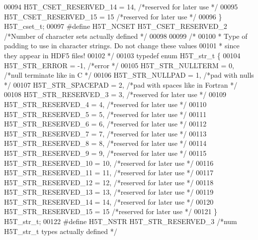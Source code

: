 \begin{DoxyCode}
00094     H5T\_CSET\_RESERVED\_14 = 14,  \textcolor{comment}{/*reserved for later use             */}
00095     H5T\_CSET\_RESERVED\_15 = 15   \textcolor{comment}{/*reserved for later use             */}
00096 \} H5T\_cset\_t;
00097 \textcolor{preprocessor}{#define H5T\_NCSET H5T\_CSET\_RESERVED\_2           }\textcolor{comment}{/*Number of character sets actually defined  */}\textcolor{preprocessor}{}
00098 
00099 \textcolor{comment}{/*}
00100 \textcolor{comment}{ * Type of padding to use in character strings.  Do not change these values}
00101 \textcolor{comment}{ * since they appear in HDF5 files!}
00102 \textcolor{comment}{ */}
00103 \textcolor{keyword}{typedef} \textcolor{keyword}{enum} H5T\_str\_t \{
00104     H5T\_STR\_ERROR        = -1,  \textcolor{comment}{/*error                                      */}
00105     H5T\_STR\_NULLTERM     = 0,   \textcolor{comment}{/*null terminate like in C                   */}
00106     H5T\_STR\_NULLPAD      = 1,   \textcolor{comment}{/*pad with nulls                             */}
00107     H5T\_STR\_SPACEPAD     = 2,   \textcolor{comment}{/*pad with spaces like in Fortran            */}
00108     H5T\_STR\_RESERVED\_3   = 3,   \textcolor{comment}{/*reserved for later use             */}
00109     H5T\_STR\_RESERVED\_4   = 4,   \textcolor{comment}{/*reserved for later use             */}
00110     H5T\_STR\_RESERVED\_5   = 5,   \textcolor{comment}{/*reserved for later use             */}
00111     H5T\_STR\_RESERVED\_6   = 6,   \textcolor{comment}{/*reserved for later use             */}
00112     H5T\_STR\_RESERVED\_7   = 7,   \textcolor{comment}{/*reserved for later use             */}
00113     H5T\_STR\_RESERVED\_8   = 8,   \textcolor{comment}{/*reserved for later use             */}
00114     H5T\_STR\_RESERVED\_9   = 9,   \textcolor{comment}{/*reserved for later use             */}
00115     H5T\_STR\_RESERVED\_10  = 10,  \textcolor{comment}{/*reserved for later use             */}
00116     H5T\_STR\_RESERVED\_11  = 11,  \textcolor{comment}{/*reserved for later use             */}
00117     H5T\_STR\_RESERVED\_12  = 12,  \textcolor{comment}{/*reserved for later use             */}
00118     H5T\_STR\_RESERVED\_13  = 13,  \textcolor{comment}{/*reserved for later use             */}
00119     H5T\_STR\_RESERVED\_14  = 14,  \textcolor{comment}{/*reserved for later use             */}
00120     H5T\_STR\_RESERVED\_15  = 15   \textcolor{comment}{/*reserved for later use             */}
00121 \} H5T\_str\_t;
00122 \textcolor{preprocessor}{#define H5T\_NSTR H5T\_STR\_RESERVED\_3     }\textcolor{comment}{/*num H5T\_str\_t types actually defined       */}\textcolor{preprocessor}{}

\end{DoxyCode}
